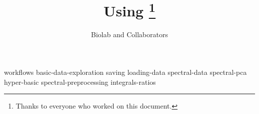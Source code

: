\documentclass[symmetric, justified, a4paper]{tufte-book}
\title{Using \mutation\thanks{Thanks to everyone who worked on this document.}}
\author[Biolab and Collaborators]{Biolab and Collaborators}
\begin{document}
\frontmatter

\maketitle



\tableofcontents

%

\mainmatter



{workflows}
{basic-data-exploration}
{saving}
{loading-data}
{spectral-data}
{spectral-pca}
{hyper-basic}
{spectral-preprocessing}
{integrals-ratios}












\backmatter





\printindex
\end{document}
